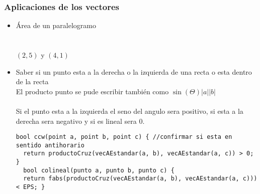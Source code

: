 \subsubsection{Aplicaciones de los vectores}
\begin{itemize}
  \item Área de un paralelogramo
  \\
  \\
  \\
  $\left ( 2,5 \right )$ y $\left (4,1 \right )$
  \item Saber si un punto esta a la derecha o la izquierda  de una recta o esta dentro de la recta
  \\El producto punto se pude escribir también como $\sin \left ( \Theta  \right )\left | a \right |\left | b \right |$
  \\
  \\
  Si el punto esta a la izquierda el seno del angulo sera positivo, si esta a la derecha sera negativo y si es lineal sera 0.
  \begin{lstlisting}[style=C]
  bool ccw(point a, point b, point c) { //confirmar si esta en sentido antihorario
  return productoCruz(vecAEstandar(a, b), vecAEstandar(a, c)) > 0; }
  bool colineal(punto a, punto b, punto c) {
  return fabs(productoCruz(vecAEstandar(a, b), vecAEstandar(a, c))) < EPS; }
  \end{lstlisting}
\end{itemize}
